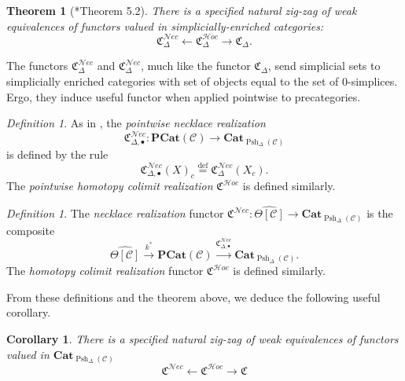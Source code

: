 \documentclass[leqno]{article}
\numberwithin{equation}{subsection}
\theoremstyle{plain}   %
\newtheorem{thm}[equation]{Theorem}
\newtheorem{cor}[equation]{Corollary}
\theoremstyle{remark}
\newtheorem{defn}[equation]{Definition}
\theoremstyle{plain}
\newcommand{\Nec}{\ensuremath{{\mathcal{N}ec}}}
\newcommand{\Hoc}{\ensuremath{{\mathcal{H}oc}}}
\newcommand{\Cat}{\ensuremath{\mathbf{Cat}}}
\providecommand{\C}{}
\renewcommand{\C}{\ensuremath{\mathcal{C}}}
\newcommand{\defeq}{\overset{\mathrm{def}}=}
\newcommand{\cellset}{\ensuremath{\widehat{\Theta[\mathcal{C}]}}}
\newcommand{\spsh}{\ensuremath{\operatorname{Psh}_\Delta(\mathcal{C})}}
\begin{document}
\begin{thm}[\cite{ds1}*{Theorem 5.2}]
	There is a specified natural zig-zag of weak equivalences of functors valued in simplicially-enriched categories:
	\[
		\mathfrak{C}^{\Nec}_\Delta \leftarrow \mathfrak{C}^{\Hoc}_\Delta \to \mathfrak{C}_\Delta.
	\]
\end{thm}

The functors \(\mathfrak{C}_\Delta^{\Nec}\) and \(\mathfrak{C}_\Delta^{\Nec}\), much like the functor \(\mathfrak{C}_\Delta\), send simplicial sets to simplicially enriched categories with set of objects equal to the set of \(0\)-simplices.  Ergo, they induce useful functor when applied pointwise to precategories.
\begin{defn}
	As in ,  the \emph{pointwise necklace realization}
	\[
		\mathfrak{C}^{\Nec}_{\Delta,\bullet}:\mathbf{PCat}(\C) \to \Cat_{\spsh}
	\] 
	is defined by the rule
	\[
		\mathfrak{C}^{\Nec}_{\Delta,\bullet}(X)_c\defeq \mathfrak{C}^{\Nec}_{\Delta}(X_c).
	\]
	The \emph{pointwise homotopy colimit realization} \(\mathfrak{C}^{\Hoc}\) is defined similarly.  
\end{defn}

\begin{defn}
	The \emph{necklace realization} functor \(\mathfrak{C}^{\Nec}:\cellset \to \Cat_{\spsh}\) is the composite
	\[
		\cellset \xrightarrow{k^\ast} \mathbf{PCat}(\C) \xrightarrow{\mathfrak{C}^{\Nec}_{\Delta,\bullet}} \Cat_{\spsh}.
	\]
	The \emph{homotopy colimit realization} functor \(\mathfrak{C}^{\Hoc}\) is defined similarly.
\end{defn}

From these definitions and the theorem above, we deduce the following useful corollary.

\begin{cor}\label{necthm}
	There is a specified natural zig-zag of weak equivalences of functors valued in \(\Cat_{\spsh}\)
	\[
		\mathfrak{C}^{\Nec} \leftarrow \mathfrak{C}^{\Hoc} \to \mathfrak{C}
	\]
\end{cor}
\end{document}
